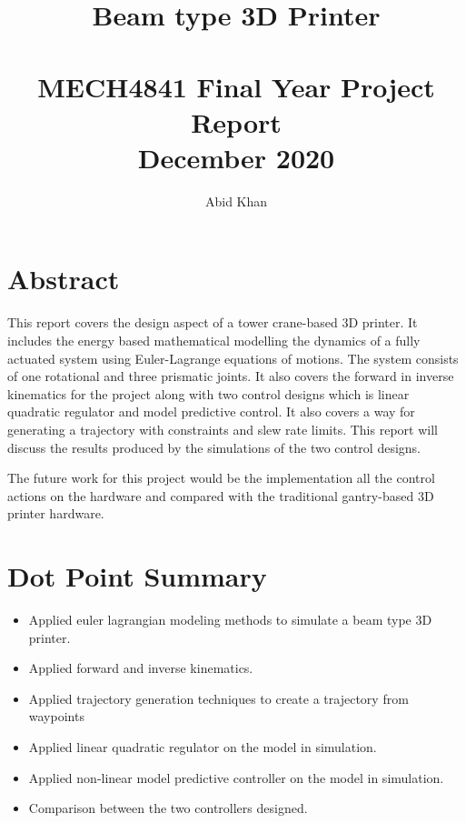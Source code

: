 \documentclass{UoNMCHA}
\numberwithin{equation}{section}
\begin{document}
	\title{Beam type 3D Printer \\ \ \\
		{\small MECH4841 Final Year Project Report  \\December 2020}}
	\author[UoNMCHA]{Abid Khan}
	\address[UoNMCHA]{
		Student of Mechatronics Engineering,\\
		The University of Newcastle, Callaghan, NSW 2308, AUSTRALIA \\
		Student Number: 3189548 \\
		E-mail: \href{mailto: c3189548@uon.edu.au}{\textsf{ c3189548@uon.edu.au}}}
	\maketitle
	\onecolumn
	
	\newpage
	\vspace{-5mm}
	\section*{Abstract}
	
	This report covers the design aspect of a tower crane-based 3D printer. It includes the energy based mathematical modelling the dynamics of a fully actuated system using Euler-Lagrange equations of motions. The system consists of one rotational and three prismatic joints. It also covers the forward in inverse kinematics for the project along with two control designs which is linear quadratic regulator and model predictive control. It also covers a way for generating a trajectory with constraints and slew rate limits. This report will discuss the results produced by the simulations of the two control designs. \par
	The future work for this project would be the implementation all the control actions on the hardware and compared with the traditional gantry-based 3D printer hardware.
	
	\newpage
	\vspace{-5mm}
	\section*{Dot Point Summary}
	
	\begin{itemize}
		\item Applied euler lagrangian modeling methods to simulate a beam type 3D printer.
		\item Applied forward and inverse kinematics.
		\item Applied trajectory generation techniques to create a trajectory from waypoints
		\item Applied linear quadratic regulator on the model in simulation.
		\item Applied non-linear model predictive controller on the model in simulation.
		\item Comparison between the two controllers designed.
		
		
		
	\end{itemize}
	\newpage
	\vspace{-2mm}
\end{document}

